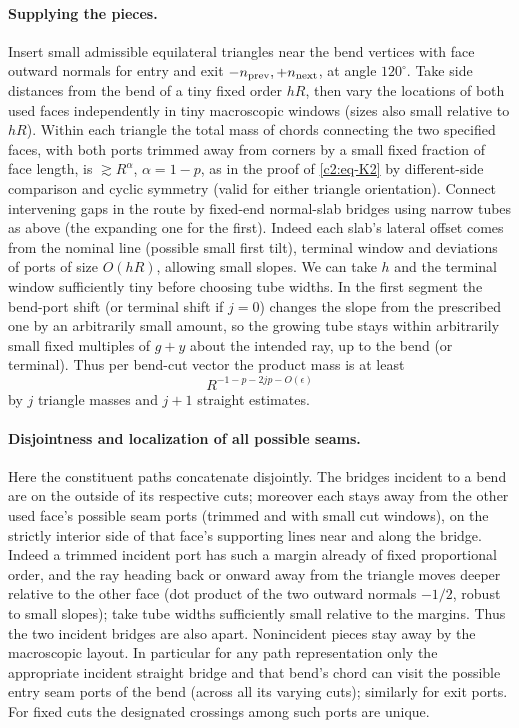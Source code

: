 \paragraph{Supplying the pieces.}
Insert small admissible equilateral triangles near the bend vertices with face outward normals for entry and exit \(-n_{\rm prev},+n_{\rm next}\), at angle \(120^\circ\). Take side distances from the bend of a tiny fixed order \(hR\), then vary the locations of both used faces independently in tiny macroscopic windows (sizes also small relative to \(hR\)). Within each triangle the total mass of chords connecting the two specified faces, with both ports trimmed away from corners by a small fixed fraction of face length, is \(\gtrsim R^\alpha\), \(\alpha=1-p\), as in the proof of \eqref{c2:eq-K2} by different-side comparison and cyclic symmetry (valid for either triangle orientation). Connect intervening gaps in the route by fixed-end normal-slab bridges using narrow tubes as above (the expanding one for the first). Indeed each slab's lateral offset comes from the nominal line (possible small first tilt), terminal window and deviations of ports of size \(O(hR)\), allowing small slopes. We can take \(h\) and the terminal window sufficiently tiny before choosing tube widths. In the first segment the bend-port shift (or terminal shift if \(j=0\)) changes the slope from the prescribed one by an arbitrarily small amount, so the growing tube stays within arbitrarily small fixed multiples of \(g+y\) about the intended ray, up to the bend (or terminal). Thus per bend-cut vector the product mass is at least
\[
 R^{-1-p-2jp-O(\epsilon)}
\]
by \(j\) triangle masses and \(j+1\) straight estimates.

\paragraph{Disjointness and localization of all possible seams.}
Here the constituent paths concatenate disjointly. The bridges incident to a bend are on the outside of its respective cuts; moreover each stays away from the other used face's possible seam ports (trimmed and with small cut windows), on the strictly interior side of that face's supporting lines near and along the bridge. Indeed a trimmed incident port has such a margin already of fixed proportional order, and the ray heading back or onward away from the triangle moves deeper relative to the other face (dot product of the two outward normals \(-1/2\), robust to small slopes); take tube widths sufficiently small relative to the margins. Thus the two incident bridges are also apart. Nonincident pieces stay away by the macroscopic layout. In particular for any path representation only the appropriate incident straight bridge and that bend's chord can visit the possible entry seam ports of the bend (across all its varying cuts); similarly for exit ports. For fixed cuts the designated crossings among such ports are unique.

